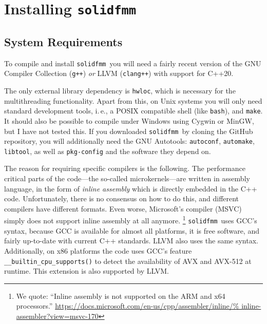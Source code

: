 \documentclass{scrbook}
\newcommand{\solidfmm}{\texttt{solidfmm}}
\begin{document}
\section{Installing \solidfmm}

\subsection{System Requirements}
To compile and install \solidfmm\ you will need a fairly recent version of the
GNU Compiler Collection (\lstinline|g++|) \emph{or} LLVM (\lstinline|clang++|)
with support for C++20. 

The only external library dependency is \lstinline|hwloc|\autocite{hwloc},
which is necessary for the multi\-threading functionality. Apart from this, on
Unix systems you will only need standard development tools, i.\,e., a POSIX
compatible shell (like \lstinline|bash|), and \lstinline|make|. It should also
be possible to compile under Windows using Cygwin or MinGW, but I have not
tested this. If you downloaded \solidfmm\ by cloning the GitHub repository, you
will additionally need the GNU Autotools: \lstinline|autoconf|,
\lstinline|automake|, \lstinline|libtool|, as well as \lstinline|pkg-config|
and the software they depend on.

The reason for requiring specific compilers is the following. The performance
critical parts of the code---the so-called microkernels---are written in
assembly language, in the form of \emph{inline assembly} which is directly
embedded in the C++ code. Unfortunately, there is no consensus on how to do
this, and different compilers have different formats. Even worse, Microsoft's
compiler (MSVC) simply does not support inline assembly at all anymore.%
\footnote{We quote: \enquote{Inline assembly is not supported on the ARM and x64
processors.} \url{https://docs.microsoft.com/en-us/cpp/assembler/inline/%
inline-assembler?view=msvc-170}} \solidfmm\ uses GCC's syntax, because GCC is
available for almost all platforms, it is free software, and fairly up-to-date
with current C++ standards. LLVM also uses the same syntax. Additionally, on
x86 platforms the code uses GCC's feature \lstinline|__builtin_cpu_supports()|
to detect the availability of AVX and AVX-512 at runtime. This extension is
also supported by LLVM. 
\end{document}

